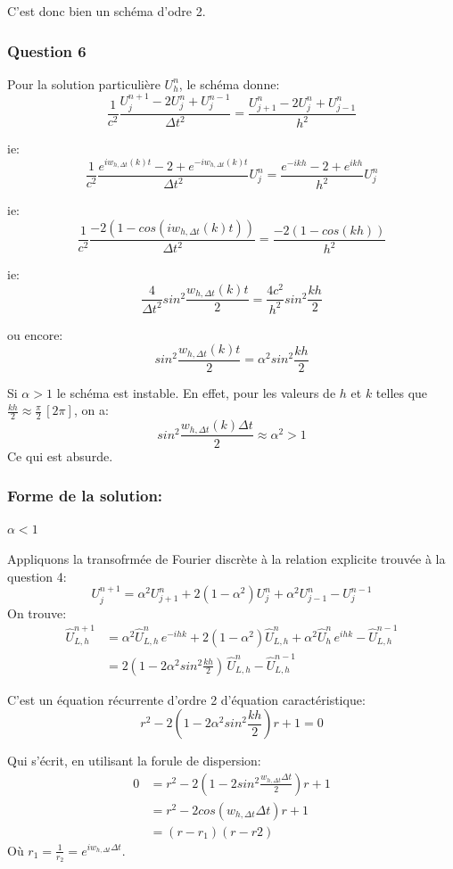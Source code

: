 \documentclass{article}
\newcommand{\Q}[1]{\subsubsection*{Question #1}}
\begin{document}
C'est donc bien un schéma d'odre 2.

\Q{6}
Pour la solution particulière $U^n_h$, le schéma donne:
$$ \frac{1}{c^2} \frac{U^{n+1}_{j} - 2U^{n}_{j} + U^{n-1}_{j}}{\Delta t^2} = \frac{U^{n}_{j+1} - 2U^{n}_{j}+U^{n}_{j-1}}{h^2}$$

ie:
$$ \frac{1}{c^2} \frac{e^{i w_{h, \Delta t} (k) t} - 2 + e^{-i w_{h, \Delta t} (k) t}}{\Delta t^2} U^n_j 
= \frac{e^{-ikh} - 2+e^{ikh}}{h^2} U^n_j $$

ie:
$$  \frac{1}{c^2} \frac{-2( 1 - cos(i w_{h, \Delta t} (k) t))}{\Delta t^2} 
= \frac{-2(1-cos(kh))}{h^2}  $$

ie:
$$ \frac{4}{\Delta t^2} sin^2 \frac{w_{h, \Delta t} (k) t}{2} = \frac{4c^2}{h^2} sin^2 \frac{kh}{2} $$

ou encore:
$$ sin^2 \frac{w_{h, \Delta t} (k) t}{2} = \alpha ^ 2 sin^2 \frac{kh}{2} $$

Si $\alpha > 1$ le schéma est instable. 
En effet, pour les valeurs de $h$ et $k$ telles que $\frac{kh}{2} \approx \frac{\pi}{2}\,[2 \pi]$, on a:
$$ sin^2 \frac{w_{h, \Delta t} (k) \Delta t}{2} \approx \alpha ^ 2 > 1 $$
Ce qui est absurde.

\subsubsection*{Forme de la solution:}

\textbf{$ \alpha < 1$}

Appliquons la transofrmée de Fourier discrète à la relation explicite trouvée à la question 4:
	$$U^{n+1}_{j} = \alpha ^ 2 U^{n}_{j+1} + 2(1-\alpha ^2) U^{n}_{j} + \alpha ^2 U^{n}_{j-1} - U^{n-1}_{j} $$
On trouve:
\begin{align*}
	\hat{U}^{n+1}_{L,h} &= \alpha ^ 2 \hat{U}^{n}_{L,h}\,e^{-ihk} + 2(1-\alpha ^2) \hat{U}^{n}_{L,h} + \alpha ^2 \hat{U}^{n}_{h}\,e^{ihk} - \hat{U}^{n-1}_{L,h} \\
&= 2(1 - 2 \alpha^2 sin^2 \frac{kh}{2}) \, \hat{U}^{n}_{L,h} - \hat{U}^{n-1}_{L,h} 
\end{align*}


C'est un équation récurrente d'ordre 2 d'équation caractéristique:
$$ r^2 - 2(1 - 2 \alpha^2 sin^2 \frac{kh}{2}) r + 1 = 0$$

Qui s'écrit, en utilisant la forule de dispersion:
\begin{align*}
0 &=  r^2 - 2(1 - 2sin^2 \frac{w_{h, \Delta t} \Delta t}{2}) r + 1 \\
&= r^2 - 2 cos(w_{h, \Delta t} \Delta t) r + 1 \\
&= (r - r_1 ) (r - r2 )
\end{align*}
Où $r_1 = \frac{1}{r_2} = e^{i w_{h, \Delta t} \Delta t} $.
\end{document}
